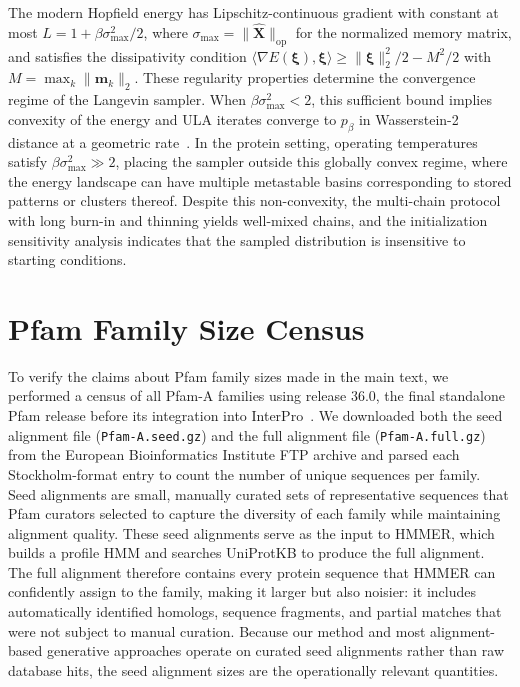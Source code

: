 \documentclass[10pt]{article}
\begin{document}
The modern Hopfield energy has Lipschitz-continuous gradient with constant at most $L = 1 + \beta\sigma_{\max}^2/2$, where $\sigma_{\max} = \|\hat{\mathbf{X}}\|_{\mathrm{op}}$ for the normalized memory matrix, and satisfies the dissipativity condition $\langle \nabla E(\boldsymbol{\xi}), \boldsymbol{\xi} \rangle \geq \|\boldsymbol{\xi}\|_2^2/2 - M^2/2$ with $M = \max_k \|\mathbf{m}_k\|_2$. These regularity properties determine the convergence regime of the Langevin sampler. When $\beta\sigma_{\max}^2 < 2$, this sufficient bound implies convexity of the energy and ULA iterates converge to $p_\beta$ in Wasserstein-2 distance at a geometric rate~\cite{dalalyanTheoreticalGuaranteesApproximate2017,durmusNonasymptoticAnalysisUnadjusted2017}. In the protein setting, operating temperatures satisfy $\beta\sigma_{\max}^2 \gg 2$, placing the sampler outside this globally convex regime, where the energy landscape can have multiple metastable basins corresponding to stored patterns or clusters thereof. Despite this non-convexity, the multi-chain protocol with long burn-in and thinning yields well-mixed chains, and the initialization sensitivity analysis indicates that the sampled distribution is insensitive to starting conditions.

\section{Pfam Family Size Census}\label{si:pfam-census}

To verify the claims about Pfam family sizes made in the main text, we performed a census of all Pfam-A families using release 36.0, the final standalone Pfam release before its integration into InterPro~\cite{paysanlafosse2023interpro}. We downloaded both the seed alignment file (\texttt{Pfam-A.seed.gz}) and the full alignment file (\texttt{Pfam-A.full.gz}) from the European Bioinformatics Institute FTP archive and parsed each Stockholm-format entry to count the number of unique sequences per family. Seed alignments are small, manually curated sets of representative sequences that Pfam curators selected to capture the diversity of each family while maintaining alignment quality. These seed alignments serve as the input to HMMER, which builds a profile HMM and searches UniProtKB to produce the full alignment. The full alignment therefore contains every protein sequence that HMMER can confidently assign to the family, making it larger but also noisier: it includes automatically identified homologs, sequence fragments, and partial matches that were not subject to manual curation. Because our method and most alignment-based generative approaches operate on curated seed alignments rather than raw database hits, the seed alignment sizes are the operationally relevant quantities.
\end{document}

